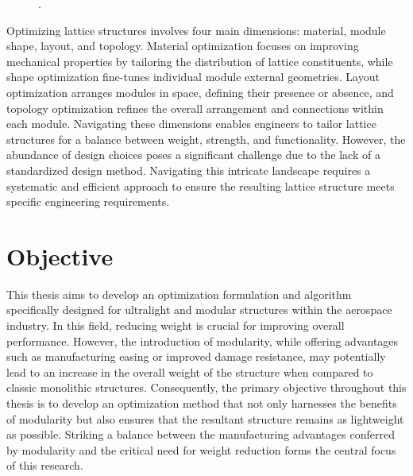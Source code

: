 \begin{figure}
    \hspace*{\fill}
    \hfill
    \hspace*{\fill}
    \caption{ \cite{costa_algorithmic_2020} \cite{cheung_reversibly_2013} .}
    \label{fig:01_fab}
\end{figure}

Optimizing lattice structures involves four main dimensions: material, module shape, layout, and topology. Material optimization focuses on improving mechanical properties by tailoring the distribution of lattice constituents, while shape optimization fine-tunes individual module external geometries. Layout optimization arranges modules in space, defining their presence or absence, and topology optimization refines the overall arrangement and connections within each module. Navigating these dimensions enables engineers to tailor lattice structures for a balance between weight, strength, and functionality. However, the abundance of design choices poses a significant challenge due to the lack of a standardized design method. Navigating this intricate landscape requires a systematic and efficient approach to ensure the resulting lattice structure meets specific engineering requirements. 

\section*{Objective}
This thesis aims to develop an optimization formulation and algorithm specifically designed for ultralight and modular structures within the aerospace industry. In this field, reducing weight is crucial for improving overall performance. However, the introduction of modularity, while offering advantages such as manufacturing easing or improved damage resistance, may potentially lead to an increase in the overall weight of the structure when compared to classic monolithic structures. Consequently, the primary objective throughout this thesis is to develop an optimization method that not only harnesses the benefits of modularity but also ensures that the resultant structure remains as lightweight as possible. Striking a balance between the manufacturing advantages conferred by modularity and the critical need for weight reduction forms the central focus of this research.

